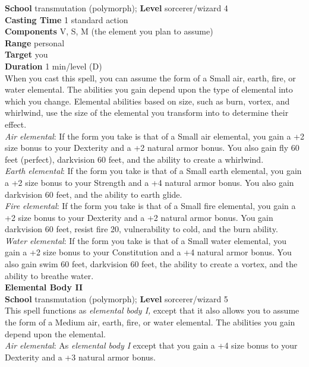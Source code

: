 \textbf{School }transmutation (polymorph); \textbf{Level }sorcerer/wizard 4\\
\textbf{Casting Time }1 standard action\\
\textbf{Components }V, S, M (the element you plan to assume)\\
\textbf{Range }personal\\
\textbf{Target }you\\
\textbf{Duration }1 min/level (D)\\
When you cast this spell, you can assume the form of a Small air, earth, fire, or water elemental. The abilities you gain depend upon the type of elemental into which you change. Elemental abilities based on size, such as burn, vortex, and whirlwind, use the size of the elemental you transform into to determine their effect.\\
\textit{Air elemental}: If the form you take is that of a Small air elemental, you gain a +2 size bonus to your Dexterity and a +2 natural armor bonus. You also gain fly 60 feet (perfect), darkvision 60 feet, and the ability to create a whirlwind.\\
\textit{Earth elemental}: If the form you take is that of a Small earth elemental, you gain a +2 size bonus to your Strength and a +4 natural armor bonus. You also gain darkvision 60 feet, and the ability to earth glide.\\
\textit{Fire elemental}: If the form you take is that of a Small fire elemental, you gain a +2 size bonus to your Dexterity and a +2 natural armor bonus. You gain darkvision 60 feet, resist fire 20, vulnerability to cold, and the burn ability.\\
\textit{Water elemental}: If the form you take is that of a Small water elemental, you gain a +2 size bonus to your Constitution and a +4 natural armor bonus. You also gain swim 60 feet, darkvision 60 feet, the ability to create a vortex, and the ability to breathe water.\\
\textbf{Elemental Body II}\\
\textbf{School }transmutation (polymorph); \textbf{Level }sorcerer/wizard 5\\
This spell functions as \textit{elemental body I, }except that it also allows you to assume the form of a Medium air, earth, fire, or water elemental. The abilities you gain depend upon the elemental.\\
\textit{Air elemental}: As \textit{elemental body I} except that you gain a +4 size bonus to your Dexterity and a +3 natural armor bonus. \\

